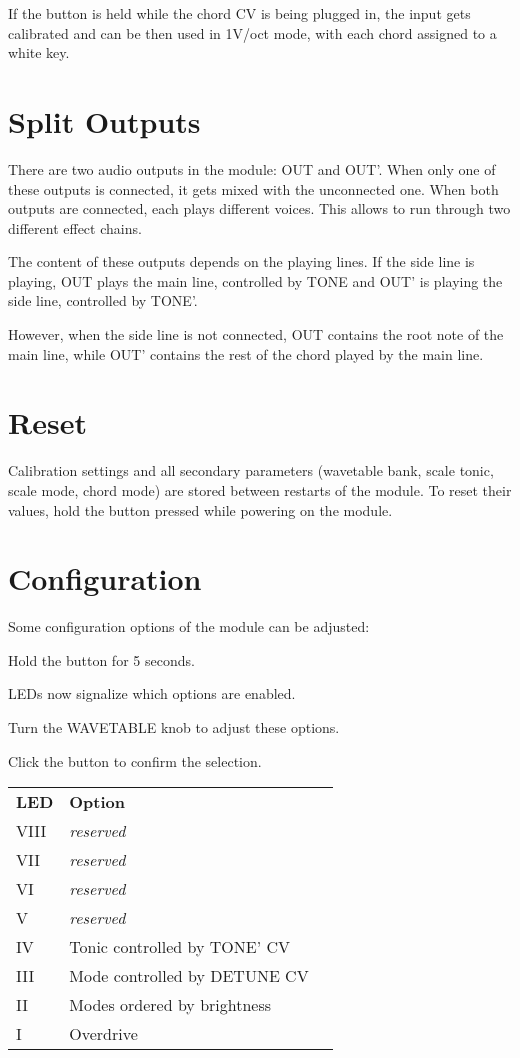 \documentclass[10pt,nofoldmark,nocombine]{leaflet} %
\newenvironment{packed_enumerate}{
\begin{enumerate}
  \setlength{\itemsep}{1pt}
  \setlength{\parskip}{0pt}
  \setlength{\parsep}{0pt}
}{\end{enumerate}}
\begin{document}
If the button is held while the chord CV is being plugged in, the input gets calibrated and can be then used in 1V/oct mode, with each chord assigned to a white key.

\section{Split Outputs}

There are two audio outputs in the module: OUT and OUT'. When only one of these outputs is connected, it gets mixed with the unconnected one. When both outputs are connected, each plays different voices. This allows to run through two different effect chains.

The content of these outputs depends on the playing lines. If the side line is playing, OUT plays the main line, controlled by TONE and OUT' is playing the side line, controlled by TONE'.

However, when the side line is not connected, OUT contains the root note of the main line, while OUT' contains the rest of the chord played by the main line.

\section{Reset}

Calibration settings and all secondary parameters (wavetable bank, scale tonic, scale mode, chord mode) are stored between restarts of the module. To reset their values, hold the button pressed while powering on the module.

\section{Configuration}

Some configuration options of the module can be adjusted:

\begin{packed_enumerate}
  \item Hold the button for 5 seconds.
  \item LEDs now signalize which options are enabled.
  \item Turn the WAVETABLE knob to adjust these options.
  \item Click the button to confirm the selection.
\end{packed_enumerate}

\begin{tabular}{@{}lll@{}}
  \textbf{LED} & \textbf{Option} \\
  VIII & \textit{reserved} \\
  VII  & \textit{reserved} \\
  VI   & \textit{reserved} \\
  V    & \textit{reserved} \\
  IV   & Tonic controlled by TONE' CV \\
  III  & Mode controlled by DETUNE CV \\
  II   & Modes ordered by brightness \\
  I    & Overdrive
\end{tabular}
\end{document}
